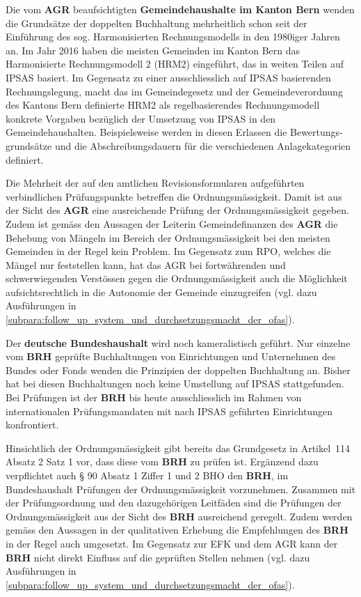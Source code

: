 \documentclass[10pt]{article}
\begin{document}
Die vom \textbf{AGR} beaufsichtigten \textbf{Gemeindehaushalte im Kanton Bern} wenden die Grundsätze der doppelten Buchhaltung mehrheitlich schon seit der Einführung des sog. Harmonisierten Rechnungsmodells in den 1980iger Jahren an. Im Jahr 2016 haben die meisten Gemeinden im Kanton Bern das Harmonisierte Rechnungsmodell 2 (HRM2) eingeführt, das in weiten Teilen auf IPSAS basiert. Im Gegensatz zu einer ausschliesslich auf IPSAS basierenden Rechnungslegung, macht das im Gemeindegesetz und der Gemeindeverordnung des Kantons Bern definierte HRM2 als regelbasierendes Rechnungsmodell konkrete Vorgaben bezüglich der Umsetzung von IPSAS in den Gemeindehaushalten. Beispielsweise werden in diesen Erlassen die Bewertungs­grundsätze und die Abschreibungsdauern für die verschiedenen Anlagekategorien definiert.

Die Mehrheit der auf den amtlichen Revisionsformularen aufgeführten verbindlichen Prüfungspunkte betreffen die Ordnungsmässigkeit. Damit ist aus der Sicht des \textbf{AGR }eine ausreichende Prüfung der Ordnungsmässigkeit gegeben. Zudem ist gemäss den Aussagen der Leiterin Gemeindefinanzen des \textbf{AGR} die Behebung von Mängeln im Bereich der Ordnungsmässigkeit bei den meisten Gemeinden in der Regel kein Problem. Im Gegensatz zum RPO, welches die Mängel nur feststellen kann, hat das AGR bei fortwährenden und schwerwiegenden Verstössen gegen die Ordnungsmässigkeit auch die Möglichkeit aufsichtsrechtlich in die Autonomie der Gemeinde einzugreifen (vgl. dazu Ausführungen in \vref{subpara:follow_up_system_und_durchsetzungsmacht_der_ofas}).

Der \textbf{deutsche Bundeshaushalt} wird noch kameralistisch geführt. Nur einzelne vom \textbf{BRH} geprüfte Buchhaltungen von Einrichtungen und Unternehmen des Bundes oder Fonds wenden die Prinzipien der doppelten Buchhaltung an. Bisher hat bei diesen Buchhaltungen noch keine Umstellung auf IPSAS stattgefunden. Bei Prüfungen ist der \textbf{BRH} bis heute ausschliesslich im Rahmen von internationalen Prüfungsmandaten mit nach IPSAS geführten Einrichtungen konfrontiert.

Hinsichtlich der Ordnungsmässigkeit gibt bereits das Grundgesetz in Artikel~114 Absatz 2 Satz 1 vor, dass diese vom \textbf{BRH} zu prüfen ist. Ergänzend dazu verpflichtet auch § 90 Absatz 1 Ziffer 1 und 2 BHO den \textbf{BRH}, im Bundeshaushalt Prüfungen der Ordnungsmässigkeit vorzunehmen. Zusammen mit der Prüfungsordnung und den dazugehörigen Leitfäden sind die Prüfungen der Ordnungsmässigkeit aus der Sicht des \textbf{BRH} ausreichend geregelt. Zudem werden gemäss den Aussagen in der qualitativen Erhebung die Empfehlungen des \textbf{BRH} in der Regel auch umgesetzt. Im Gegensatz zur EFK und dem AGR kann der \textbf{BRH} nicht direkt Einfluss auf die geprüften Stellen nehmen (vgl. dazu Ausführungen in \vref{subpara:follow_up_system_und_durchsetzungsmacht_der_ofas}).
\end{document}
